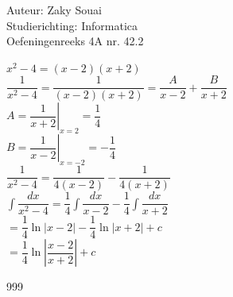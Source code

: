 \documentclass[a4paper]{article}
\begin{document}
  
\noindent \large Auteur: Zaky Souai \\
\noindent \large Studierichting:  Informatica\\
\noindent \large Oefeningenreeks 4A nr. 42.2\\

\bigskip

\normalsize

$\displaystyle x^2-4=(x-2)(x+2)$\\

$\displaystyle \dfrac{1}{x^2-4}=\dfrac{1}{(x-2)(x+2)}=\dfrac{A}{x-2}+\dfrac{B}{x+2}$\\

$\displaystyle A=\left.\dfrac{1}{x+2}\right|_{x=2}=\dfrac{1}{4}$\\

$\displaystyle B=\left.\dfrac{1}{x-2}\right|_{x=-2}=-\dfrac{1}{4}$\\

$\displaystyle \dfrac{1}{x^2-4}=\dfrac{1}{4(x-2)}-\dfrac{1}{4(x+2)}$\\

$\displaystyle \int \dfrac{dx}{x^2-4}=\dfrac{1}{4}\int\dfrac{dx}{x-2}-\dfrac{1}{4}\int\dfrac{dx}{x+2}$\\

$\displaystyle =\dfrac{1}{4}\ln|x-2|-\dfrac{1}{4}\ln|x+2|+c$\\

$\displaystyle =\dfrac{1}{4}\ln\left|\dfrac{x-2}{x+2}\right|+c$


\begin{thebibliography}{999}
\end{thebibliography}
\end{document}
